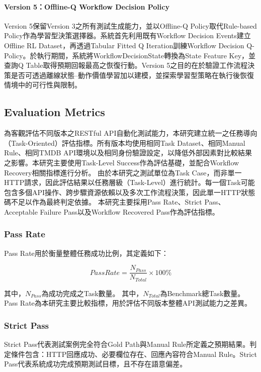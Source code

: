 \begin{ZhChapter}
\paragraph{Version 5：Offline-Q Workflow Decision Policy}
\text Version 5保留Version 3之所有測試生成能力，並以Offline-Q Policy取代Rule-based Policy作為學習型決策選擇器。系統首先利用既有Workflow Decision Events建立Offline RL Dataset，再透過Tabular Fitted Q Iteration訓練Workflow Decision Q-Policy。於執行期間，系統將WorkflowDecisionState轉換為State Feature Key，並查詢Q Table取得預期回報最高之恢復行動。Version 5之目的在於驗證工作流程決策是否可透過離線狀態--動作價值學習加以建模，並探索學習型策略在執行後恢復情境中的可行性與限制。

\subsection{Evaluation Metrics}

\text 為客觀評估不同版本之RESTful API自動化測試能力，本研究建立統一之任務導向（Task-Oriented）評估指標。所有版本均使用相同Task Dataset、相同Manual Rule、相同TMDB API環境以及相同身份驗證設定，以降低外部因素對比較結果之影響。本研究主要使用Task-Level Success作為評估基礎，並配合Workflow Recovery相關指標進行分析。
\text 由於本研究之測試單位為Task Case，而非單一HTTP請求，因此評估結果以任務層級（Task-Level）進行統計。每一個Task可能包含多個API操作、跨步驟資源依賴以及多次工作流程決策，因此單一HTTP狀態碼不足以作為最終判定依據。
\text 本研究主要採用Pass Rate、Strict Pass、Acceptable Failure Pass以及Workflow Recovered Pass作為評估指標。

\subsubsection{Pass Rate}
\text Pass Rate用於衡量整體任務成功比例，其定義如下：

\begin{equation}
PassRate=
\frac{N_{Pass}}
{N_{Total}}
\times100\%
\end{equation}

其中，$N_{Pass}$為成功完成之Task數量。
其中，$N_{Total}$為Benchmark總Task數量。Pass Rate為本研究主要比較指標，用於評估不同版本整體API測試能力之差異。

\subsubsection{Strict Pass}
\text Strict Pass代表測試案例完全符合Gold Path與Manual Rule所定義之預期結果。判定條件包含：HTTP回應成功、必要欄位存在、回應內容符合Manual Rule。Strict Pass代表系統成功完成預期測試目標，且不存在語意偏差。


\end{ZhChapter}

